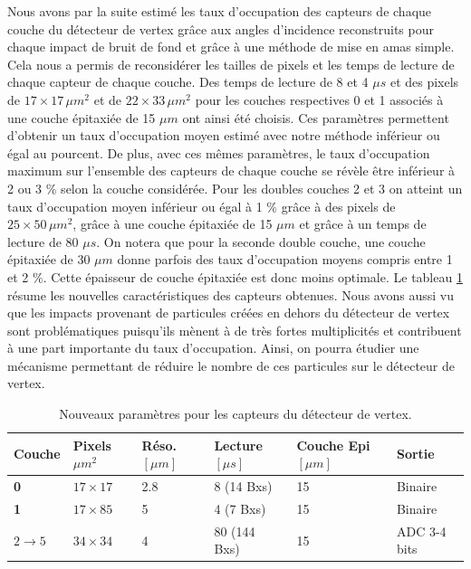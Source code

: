    Nous avons par la suite estim\'e les taux d'occupation des capteurs de chaque couche du d\'etecteur de vertex gr\^ace aux angles d'incidence reconstruits pour chaque impact de bruit de fond et gr\^ace \`a une m\'ethode de mise en amas simple. Cela nous a permis de reconsid\'erer les tailles de pixels et les temps de lecture de chaque capteur de chaque couche. Des temps de lecture de 8 et 4 $\mu s$ et des pixels de $17 \times 17 \, \mu m^2$ et de $22 \times 33 \, \mu m^2$ pour les couches respectives 0 et 1 associ\'es \`a une couche \'epitaxi\'ee de 15 $\mu m$ ont ainsi \'et\'e choisis. Ces param\`etres permettent d'obtenir un taux d'occupation moyen estim\'e avec notre m\'ethode inf\'erieur ou \'egal au pourcent. De plus, avec ces m\^emes param\`etres, le taux d'occupation maximum sur l'ensemble des capteurs de chaque couche se r\'ev\`ele \^etre inf\'erieur \`a 2 ou 3 $\%$ selon la couche consid\'er\'ee. Pour les doubles couches 2 et 3 on atteint un taux d'occupation moyen inf\'erieur ou \'egal \`a 1 $\%$ gr\^ace \`a des pixels de $25 \times 50 \, \mu m^2$, gr\^ace \`a une couche \'epitaxi\'ee de 15 $\mu m$ et gr\^ace \`a un temps de lecture de 80 $\mu s$. On notera que pour la seconde double couche, une couche \'epitaxi\'ee de 30 $\mu m$ donne parfois des taux d'occupation moyens compris entre 1 et 2 $\%$. Cette \'epaisseur de couche \'epitaxi\'ee est donc moins optimale. Le tableau \ref{tab:new_param_sensors} r\'esume les nouvelles caract\'eristiques des capteurs obtenues. Nous avons aussi vu que les impacts provenant de particules cr\'e\'ees en dehors du d\'etecteur de vertex sont probl\'ematiques puisqu'ils m\`enent \`a de tr\`es fortes multiplicit\'es et contribuent \`a une part importante du taux d'occupation. Ainsi, on pourra \'etudier une m\'ecanisme permettant de r\'eduire le nombre de ces particules sur le d\'etecteur de vertex.
   
   \medskip
   
   \begin{table}[h]
   \small
   \centering
    \begin{tabular}{|l|l|l|l|l|l|}
     \hline
     \textbf{Couche}            & \textbf{Pixels $\mu m^2$} & \textbf{R\'eso. $[\mu m]$} & \textbf{Lecture $[\mu s]$} & \textbf{Couche Epi $[\mu m]$} & \textbf{Sortie} \\ \hline
     \textbf{0}                 & $17 \times 17$  & 2.8                           & 8 (14 Bxs)                    & 15                            & Binaire         \\ \hline
     \textbf{1}                 & $17 \times 85$  & 5                             & 4 (7 Bxs)                     & 15                            & Binaire         \\ \hline
     $2 \rightarrow 5$ & $34 \times 34$  & 4                             & 80 (144 Bxs)                  & 15                            & ADC 3-4 bits    \\ \hline
    \end{tabular}
    \caption{Nouveaux param\`etres pour les capteurs du d\'etecteur de vertex.}
    \label{tab:new_param_sensors}
   \end{table}
   
